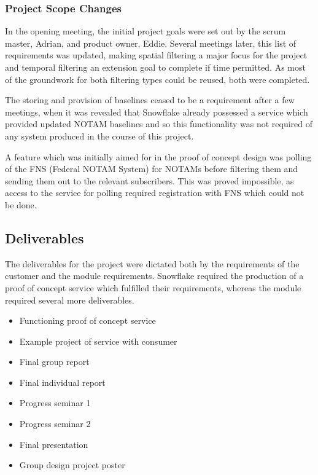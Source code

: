 \documentclass[a4paper, 12pt, twoside]{article}
\begin{document}
\subsubsection{Project Scope Changes}
In the opening meeting, the initial project goals were set out by the scrum master, Adrian, and product owner, Eddie. Several meetings later, this list of requirements was updated, making spatial filtering a major focus for the project and temporal filtering an extension goal to complete if time permitted. As most of the groundwork for both filtering types could be reused, both were completed.

The storing and provision of baselines ceased to be a requirement after a few meetings, when it was revealed that Snowflake already possessed a service which provided updated NOTAM baselines and so this functionality was not required of any system produced in the course of this project.

A feature which was initially aimed for in the proof of concept design was polling of the FNS (Federal NOTAM System) for NOTAMs before filtering them and sending them out to the relevant subscribers. This was proved impossible, as access to the service for polling required registration with FNS which could not be done.

\subsection{Deliverables}
\label{sec:plan_deliverables}

The deliverables for the project were dictated both by the requirements of the customer and the module requirements. Snowflake required the production of a proof of concept service which fulfilled their requirements, whereas the module required several more deliverables.

\begin{itemize}
\item Functioning proof of concept service
\item Example project of service with consumer
\item Final group report
\item Final individual report
\item Progress seminar 1
\item Progress seminar 2
\item Final presentation
\item Group design project poster
\end{itemize}
\end{document}
